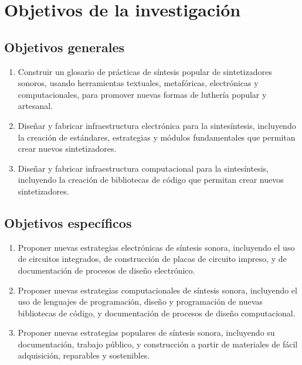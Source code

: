 \documentclass[../proyecto.tex]{subfiles}
\begin{document}
\chapter{Objetivos de la investigación}


\section{Objetivos generales}

\begin{enumerate}
    \item Construir un glosario de prácticas de síntesis popular de sintetizadores sonoros, usando herramientas textuales, metafóricas, electrónicas y computacionales, para promover nuevas formas de luthería popular y artesanal.
    \item Diseñar y fabricar infraestructura electrónica para la sintesíntesis, incluyendo la creación de estándares, estrategias y módulos fundamentales que permitan crear nuevos sintetizadores.
    \item  Diseñar y fabricar infraestructura computacional para la sintesíntesis, incluyendo la creación de bibliotecas de código que permitan crear nuevos sintetizadores.
\end{enumerate}

\section{Objetivos específicos}

\begin{enumerate}
    \item Proponer nuevas estrategias electrónicas de síntesis sonora, incluyendo el uso de circuitos integrados, de construcción de placas de circuito impreso, y de documentación de procesos de diseño electrónico.
    \item Proponer nuevas estrategias computacionales de síntesis sonora, incluyendo el uso de lenguajes de programación, diseño y programación de nuevas bibliotecas de código, y documentación de procesos de diseño computacional.
    \item Proponer nuevas estrategias populares de síntesis sonora, incluyendo su documentación, trabajo público, y construcción a partir de materiales de fácil adquisición, reparables y sostenibles.
\end{enumerate}
\end{document}
